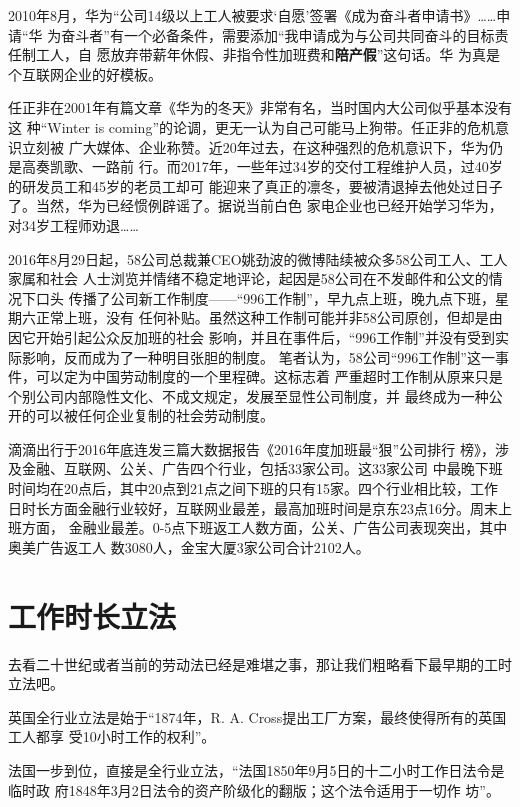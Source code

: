 2010年8月，华为“公司14级以上工人被要求`自愿'签署《成为奋斗者申请书》……申请“华
为奋斗者”有一个必备条件，需要添加“我申请成为与公司共同奋斗的目标责任制工人，自
愿放弃带薪年休假、非指令性加班费和\textbf{陪产假}”这句话。\cite{huaweifendou}华
为真是个互联网企业的好模板。

任正非在2001年有篇文章《华为的冬天》非常有名，当时国内大公司似乎基本没有这
种“Winter is coming”的论调，更无一认为自己可能马上狗带。任正非的危机意识立刻被
广大媒体、企业称赞。近20年过去，在这种强烈的危机意识下，华为仍是高奏凯歌、一路前
行。而2017年，一些年过34岁的交付工程维护人员，过40岁的研发员工和45岁的老员工却可
能迎来了真正的凛冬，要被清退掉去他处过日子了。当然，华为已经惯例辟谣了。据说当前白色
家电企业也已经开始学习华为，对34岁工程师劝退……

2016年8月29日起，58公司总裁兼CEO姚劲波的微博陆续被众多58公司工人、工人家属和社会
人士浏览并情绪不稳定地评论\cite{tai58}，起因是58公司在不发邮件和公文的情况下口头
传播了公司新工作制度——“996工作制”，早九点上班，晚九点下班，星期六正常上班，没有
任何补贴。虽然这种工作制可能并非58公司原创，但却是由因它开始引起公众反加班的社会
影响，并且在事件后，“996工作制”并没有受到实际影响，反而成为了一种明目张胆的制度。
笔者认为，58公司“996工作制”这一事件，可以定为中国劳动制度的一个里程碑。这标志着
严重超时工作制从原来只是个别公司内部隐性文化、不成文规定，发展至显性公司制度，并
最终成为一种公开的可以被任何企业复制的社会劳动制度。

滴滴出行于2016年底连发三篇大数据报告《2016年度加班最“狠”公司排行
榜》\cite{zuihen}，涉及金融、互联网、公关、广告四个行业，包括33家公司。这33家公司
中最晚下班时间均在20点后，其中20点到21点之间下班的只有15家。四个行业相比较，工作
日时长方面金融行业较好，互联网业最差，最高加班时间是京东23点16分。周末上班方面，
金融业最差。0-5点下班返工人数方面，公关、广告公司表现突出，其中奥美广告返工人
数3080人，金宝大厦3家公司合计2102人。

\section{工作时长立法}

去看二十世纪或者当前的劳动法已经是难堪之事，那让我们粗略看下最早期的工时立法吧。

英国全行业立法是始于“1874年，R. A. Cross提出工厂方案，最终使得所有的英国工人都享
受10小时工作的权利”。

法国一步到位，直接是全行业立法，“法国1850年9月5日的十二小时工作日法令是临时政
府1848年3月2日法令的资产阶级化的翻版；这个法令适用于一切作
坊”。

